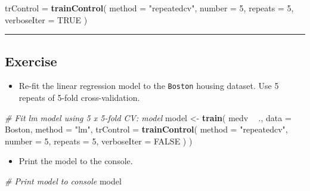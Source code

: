 \documentclass[
]{book}
\newenvironment{Shaded}{\begin{snugshade}}{\end{snugshade}}
\newcommand{\CommentTok}[1]{\textcolor[rgb]{0.56,0.35,0.01}{\textit{#1}}}
\newcommand{\DataTypeTok}[1]{\textcolor[rgb]{0.13,0.29,0.53}{#1}}
\newcommand{\DecValTok}[1]{\textcolor[rgb]{0.00,0.00,0.81}{#1}}
\newcommand{\KeywordTok}[1]{\textcolor[rgb]{0.13,0.29,0.53}{\textbf{#1}}}
\newcommand{\NormalTok}[1]{#1}
\newcommand{\OperatorTok}[1]{\textcolor[rgb]{0.81,0.36,0.00}{\textbf{#1}}}
\newcommand{\OtherTok}[1]{\textcolor[rgb]{0.56,0.35,0.01}{#1}}
\newcommand{\StringTok}[1]{\textcolor[rgb]{0.31,0.60,0.02}{#1}}
\providecommand{\tightlist}{%
  \setlength{\itemsep}{0pt}\setlength{\parskip}{0pt}}
\begin{document}
\begin{Shaded}
\begin{Highlighting}[]
\NormalTok{trControl =}\StringTok{ }\KeywordTok{trainControl}\NormalTok{(}
  \DataTypeTok{method =} \StringTok{"repeatedcv"}\NormalTok{, }\DataTypeTok{number =} \DecValTok{5}\NormalTok{,}
  \DataTypeTok{repeats =} \DecValTok{5}\NormalTok{, }\DataTypeTok{verboseIter =} \OtherTok{TRUE}
\NormalTok{)}
\end{Highlighting}
\end{Shaded}

\begin{center}\rule{0.5\linewidth}{0.5pt}\end{center}

\hypertarget{exercise-7}{%
\subsection*{Exercise}\label{exercise-7}}

\begin{itemize}
\tightlist
\item
  Re-fit the linear regression model to the \texttt{Boston} housing dataset. Use 5 repeats of 5-fold cross-validation.
\end{itemize}

\begin{Shaded}
\begin{Highlighting}[]
\CommentTok{# Fit lm model using 5 x 5-fold CV: model}
\NormalTok{model <-}\StringTok{ }\KeywordTok{train}\NormalTok{(}
\NormalTok{  medv }\OperatorTok{~}\StringTok{ }\NormalTok{., }\DataTypeTok{data =}\NormalTok{ Boston,}
  \DataTypeTok{method =} \StringTok{"lm"}\NormalTok{,}
  \DataTypeTok{trControl =} \KeywordTok{trainControl}\NormalTok{(}
    \DataTypeTok{method =} \StringTok{"repeatedcv"}\NormalTok{, }\DataTypeTok{number =} \DecValTok{5}\NormalTok{,}
    \DataTypeTok{repeats =} \DecValTok{5}\NormalTok{, }\DataTypeTok{verboseIter =} \OtherTok{FALSE}
\NormalTok{  )}
\NormalTok{)}
\end{Highlighting}
\end{Shaded}

\begin{itemize}
\tightlist
\item
  Print the model to the console.
\end{itemize}

\begin{Shaded}
\begin{Highlighting}[]
\CommentTok{# Print model to console}
\NormalTok{model}
\end{Highlighting}
\end{Shaded}
\end{document}
